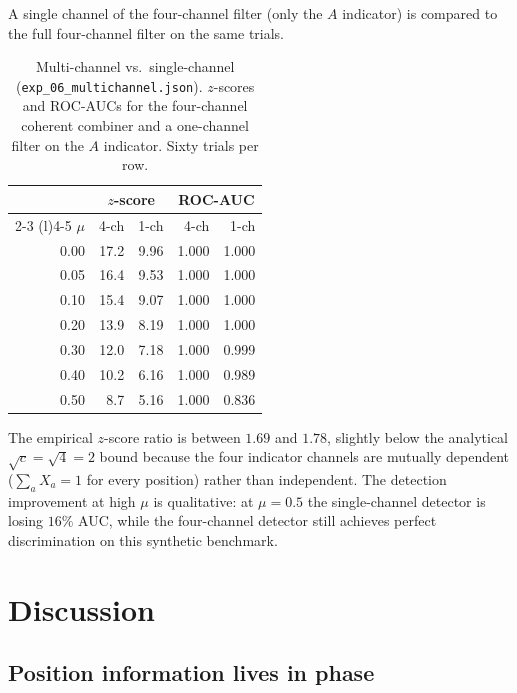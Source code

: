 \documentclass[twocolumn,11pt,a4paper]{article}
\theoremstyle{definition}
\theoremstyle{remark}
\begin{document}
A single channel of the four-channel filter (only the $A$ indicator)
is compared to the full four-channel filter on the same trials.



\begin{table}[t]
  \centering\small
  \caption{Multi-channel vs.\ single-channel
  (\texttt{exp\_06\_multichannel.json}). $z$-scores and ROC-AUCs for
  the four-channel coherent combiner and a one-channel filter on the
  $A$ indicator. Sixty trials per row.}
  \label{tab:multi_ch}
  \begin{tabular}{r | r r r r}
    \toprule
    & \multicolumn{2}{c}{$z$-score} & \multicolumn{2}{c}{ROC-AUC} \\
    \cmidrule(l){2-3} \cmidrule(l){4-5}
    $\mu$ & 4-ch & 1-ch & 4-ch & 1-ch \\
    \midrule
    0.00 & 17.2 & 9.96 & 1.000 & 1.000 \\
    0.05 & 16.4 & 9.53 & 1.000 & 1.000 \\
    0.10 & 15.4 & 9.07 & 1.000 & 1.000 \\
    0.20 & 13.9 & 8.19 & 1.000 & 1.000 \\
    0.30 & 12.0 & 7.18 & 1.000 & 0.999 \\
    0.40 & 10.2 & 6.16 & 1.000 & 0.989 \\
    0.50 & \phantom{0}8.7 & 5.16 & 1.000 & 0.836 \\
    \bottomrule
  \end{tabular}
\end{table}

The empirical $z$-score ratio is between $1.69$ and $1.78$, slightly
below the analytical $\sqrt{c} = \sqrt{4} = 2$ bound because the four
indicator channels are mutually dependent ($\sum_a X_a = 1$ for every
position) rather than independent. The detection improvement at high
$\mu$ is qualitative: at $\mu = 0.5$ the single-channel detector is
losing $16\%$ AUC, while the four-channel detector still achieves
perfect discrimination on this synthetic benchmark.

\section{Discussion}
\label{sec:discussion}

\subsection{Position information lives in phase}
\end{document}
